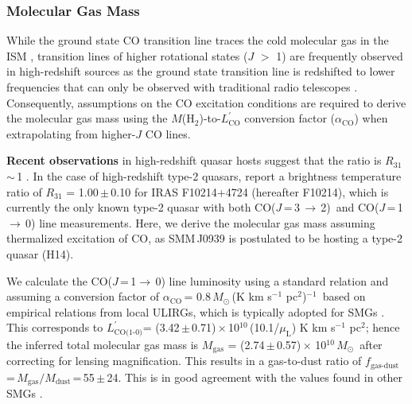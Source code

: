 \documentclass[iop, revtex4]{emulateapj}
\newcommand{\Msun}{\mbox{$M_{\odot}$}}
\newcommand{\rarr}{$\rightarrow$}
\newcommand{\CO}{\mbox{CO($J$\,=\,3\,$\rightarrow$\,2) }}
\newcommand{\Lp}{\mbox{$L^{\prime}_\textrm{CO(1-0)}$}}
\newcommand{\LpU}{\mbox{K\,\,km\,\,s$^{-1}$\,\,pc$^2$}}
\newcommand{\eg}{{\sl e.g.,~}}
\newcommand{\pmOne}{\mbox{$^{-1}$}}
\begin{document}
\subsubsection{Molecular Gas Mass} \label{sec:gas}
While the ground state CO transition line traces the cold molecular gas in the ISM
\citep*[\eg][]{Wilson70a,Downes98a}, transition lines of higher rotational states ($J$ $>$ 1) are frequently observed in high-redshift sources as the
 ground state transition line is redshifted to lower frequencies that can only be observed with traditional radio telescopes
 \citep{Carilli13a}. Consequently, assumptions on the CO excitation conditions are required to derive the molecular gas mass using the $M$(H$_\textrm{2}$)-to-$L^{\prime}_\textrm{CO}$
 conversion factor ($\alpha_\mathrm{CO}$) when extrapolating from higher-$J$ CO lines. \par
{\bf Recent observations} in high-redshift quasar hosts suggest that the ratio
   is $R_\textrm{31}$\,$\sim$\,1 \citep{Riechers06a, Riechers11a}. In the case of high-redshift type-2 quasars, \citet{Riechers11a} report a brightness temperature ratio of $R_\textrm{31}$ = 1.00\,$\pm$\,0.10 for IRAS F10214+4724 (hereafter F10214), which is currently the only known type-2 quasar with both \CO and CO($J$\,=\,1\,\rarr\,0) line measurements. 
Here, we derive the molecular gas mass
assuming thermalized excitation of CO, as SMM\,J0939 is
postulated to be hosting a type-2 quasar (H14). \par
We calculate the CO($J$\,=\,1\rarr\,0) line luminosity using a standard relation
\citep[\eg][]{Solomon05a}
and assuming a conversion factor of $\alpha_\textrm{CO}$\,= 0.8\,\Msun\,(\LpU)\pmOne\ based on empirical relations from local ULIRGs, which is typically
adopted for SMGs \citep[\eg][]{Tacconi06a,Tacconi08a,Bothwell13a}.
This corresponds to \Lp = (3.42\,$\pm$\,0.71)\,$\times$\,10$^{10}$\,(10.1/$\mu_\textrm{L}$) \LpU; hence the inferred total molecular gas mass is $M_\textrm{gas}$ = (2.74\,$\pm$\,0.57)\,$\times$\,\,10$^{10}$\,\Msun\, after correcting for lensing magnification. This results in a gas-to-dust
ratio of $f_\textrm{gas-dust}$\,=\,$M_\textrm{gas}/M_\textrm{dust}$\,=\,55\,$\pm$\,24. 
This is in good agreement  with the
values found in other SMGs \citep{Coppin08a,Micha10a,Riechers11c}.
\end{document}

